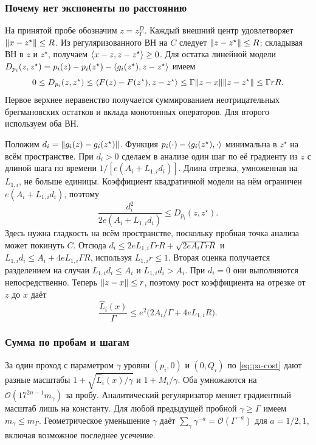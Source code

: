 \subsubsection{Почему нет экспоненты по расстоянию}

На принятой пробе обозначим $z=z_\Gamma^D$.
Каждый внешний центр удовлетворяет $\lVert x-z^\star\rVert\le R$.
Из регуляризованного ВН на $C$ следует $\lVert z-z^\star\rVert\le R$:
складывая ВН в $z$ и $z^\star$, получаем
$\langle x-z,z-z^\star\rangle\ge0$. Для остатка линейной модели
$D_{p_i}(z,z^\star)=p_i(z)-p_i(z^\star)
-\langle g_i(z^\star),z-z^\star\rangle$ имеем
\[
 0\le D_{p_i}(z,z^\star)\le
 \langle F(z)-F(z^\star),z-z^\star\rangle
 \le\Gamma\lVert z-x\rVert\lVert z-z^\star\rVert\le\Gamma rR.
\]
Первое верхнее неравенство получается суммированием
неотрицательных брегмановских остатков и вклада монотонных
операторов. Для второго используем оба ВН.

Положим $d_i=\lVert g_i(z)-g_i(z^\star)\rVert$.
Функция $p_i(\cdot)-\langle g_i(z^\star),\cdot\rangle$ минимальна
в $z^\star$ на всём пространстве. При $d_i>0$ сделаем в анализе
один шаг по её градиенту из $z$ с длиной шага по времени
$1/[e(A_i+L_{1,i}d_i)]$. Длина отрезка, умноженная на
$L_{1,i}$, не больше единицы. Коэффициент квадратичной модели
на нём ограничен $e(A_i+L_{1,i}d_i)$, поэтому
\[
 \frac{d_i^2}{2e(A_i+L_{1,i}d_i)}\le D_{p_i}(z,z^\star).
\]
Здесь нужна гладкость на всём пространстве, поскольку пробная
точка анализа может покинуть $C$. Отсюда
$d_i\le2eL_{1,i}\Gamma rR+\sqrt{2eA_i\Gamma rR}$ и
$L_{1,i}d_i\le A_i+4eL_{1,i}\Gamma R$, используя $L_{1,i}r\le1$.
Вторая оценка получается разделением на случаи
$L_{1,i}d_i\le A_i$ и $L_{1,i}d_i>A_i$. При $d_i=0$ они
выполняются непосредственно. Теперь $\lVert z-x\rVert\le r$,
поэтому рост коэффициента на отрезке от $z$ до $x$ даёт
\begin{equation}\label{eq:hpe-curv}
 \frac{\widehat L_i(x)}{\Gamma}
 \le e^2\bigl(2A_i/\Gamma+4e L_{1,i}R\bigr).
\end{equation}

\subsubsection{Сумма по пробам и шагам}

За один проход с параметром $\gamma$ уровни $(p_i,0)$ и $(0,Q_i)$
по \eqref{eq:pa-cost} дают разные масштабы
$1+\sqrt{\widehat L_i(x)/\gamma}$ и $1+M_i/\gamma$.
Оба умножаются на $\mathcal O(17^{2n-1}m_\gamma)$ за пробу.
Аналитический регуляризатор меняет градиентный масштаб лишь
на константу. Для любой предыдущей пробной $\gamma\ge\Gamma$
имеем $m_\gamma\le m_\Gamma$. Геометрическое уменьшение $\gamma$
даёт $\sum_\gamma \gamma^{-a}=\mathcal O(\Gamma^{-a})$
для $a=1/2,1$, включая возможное последнее усечение.

